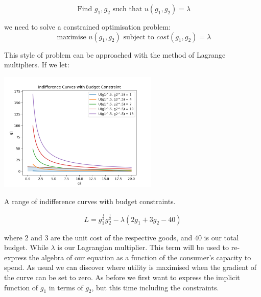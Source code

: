 \documentclass{tufte-handout}
\begin{document}
$$ \text{ Find } g_{1}, g_{2} \text{ such that } u(g_{1}, g_{2}) = \lambda $$

\noindent we need to solve a constrained optimisation problem: 
$$ \text{ maximise } u(g_{1}, g_{2})  \text{ subject to } cost(g_{1}, g_{2}) =  \lambda$$

\noindent This style of problem can be approached with the method of Lagrange multipliers. If we let:

\begin{marginfigure}
\includegraphics[width=3in, height=5.in]{Plots/indifference_curves_budget.png}
\caption{A range of indifference curves with budget constraints.}
\end{marginfigure}

$$ L = g_{1}^{\frac{1}{2}}g_{2}^{\frac{1}{2}} - \lambda(2g_{1} + 3g_{2} - 40) $$

\noindent where $2$ and $3$ are the unit cost of the respective goods, and $40$ is our total budget. While $\lambda$ is our Lagrangian multiplier. This term will be used to re-express the algebra of our equation as a function of the consumer's capacity to spend. As usual we can discover where utility is maximised when the gradient of the curve can be set to zero. As before we first want to express the implicit function of $g_{1}$ in terms of $g_{2}$, but this time including the constraints.
\end{document}
